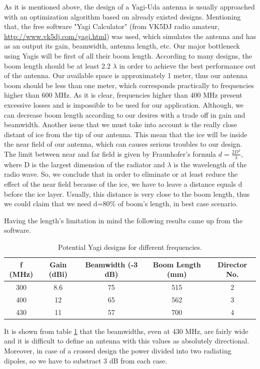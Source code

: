 As it is mentioned above, the design of a Yagi-Uda antenna is usually approached with an optimization algorithm based on already existed designs. Mentioning that, the free software "Yagi Calculator" (from VK5DJ radio amateur, \url{http://www.vk5dj.com/yagi.html}) was used, which simulates the antenna and has as an output its gain, beamwidth, antenna length, etc. Our major bottleneck using Yagis will be first of all their boom length. According to many designs, the boom length should be at least 2.2 $\lambda$ in order to achieve the best performance out of the antenna. Our available space is approximately 1 meter, thus our antenna boom should be less than one meter, which corresponds practically to frequencies higher than 600 MHz. As it is clear, frequencies higher than 400 MHz present excessive losses and is impossible to be used for our application. Although, we can decrease boom length according to our desires with a trade off in gain and beamwidth. Another issue that we must take into account is the really close distant of ice from the tip of our antenna. This mean that the ice will be inside the near field of our antenna, which can causes serious troubles to our design. The limit between near and far field is given by Fraunhofer's formula $d=\frac{2D^2}{\lambda}$, where D is the largest dimension of the radiator and $\lambda$ is the wavelength of the radio wave. So, we conclude that in order to eliminate or at least reduce the effect of the near field because of the ice, we have to leave a distance equals d before the ice layer. Usually, this distance is very close to the boom length, thus we could claim that we need d=80\% of boom's length, in best case scenario. 

Having the length's limitation in mind the following results came up from the software.
\begin{table}[h]
\begin{tabular}{| c | c | c | c | c |}
\hline
 f (MHz) & Gain (dBi) & Beamwidth (-3 dB) & Boom Length (mm) & Director No. \\ 
 \hline
 300 & 8.6 & 75 & 515 & 2 \\  
 \hline
 400 & 12 & 65 & 562 & 3\\
 \hline
  430 & 11 & 57 & 700 & 4 \\
 \hline
\end{tabular}
\caption{Potential Yagi designs for different frequencies.}
\label{table: Yagi}
\end{table}

It is shown from table \ref{table: Yagi} that the beamwidths, even at 430 MHz, are fairly wide and it is difficult to define an antenna with this values as absolutely directional. Moreover, in case of a crossed design the power divided into two radiating dipoles, so we have to substract 3 dB from each case.

